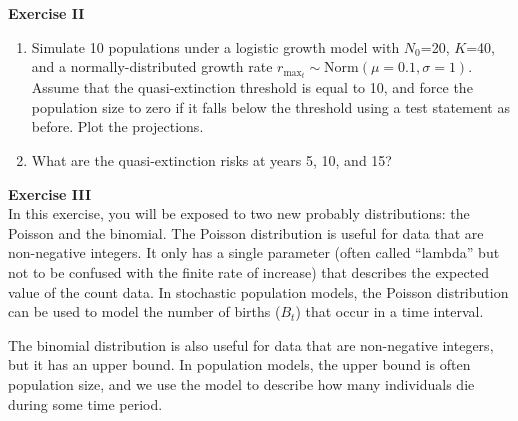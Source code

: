 \documentclass[12pt]{article}\usepackage[]{graphicx}\usepackage[]{color}
\begin{document}
\vspace{12pt}


{\bf Exercise II \\}
\begin{enumerate}
  \item Simulate 10 populations under a logistic growth model with
    $N_0$=20, $K$=40, and a normally-distributed growth rate $r_{\mathrm{max}_t}
    \sim \mathrm{Norm}(\mu=0.1, \sigma=1)$. Assume that the
    quasi-extinction threshold is
    equal to 10, and force the population size to zero if it falls
    below the threshold using a test statement as before. Plot the
    projections.
  \item What are the quasi-extinction risks at years 5, 10, and 15?
\end{enumerate}


\newpage


{\bf Exercise III \\}
In this exercise, you will be exposed to two new probably
distributions: the Poisson and the binomial. The Poisson distribution
is useful for data that are non-negative integers. It only has
a single parameter (often called ``lambda'' but not to be confused with the
finite rate of increase) that describes the expected value of the
count data. In stochastic population models, the Poisson distribution
can be used to model the number of births ($B_t$) that occur in a time
interval. 

The binomial distribution is also useful for data that are
non-negative integers, but it has an upper bound. In population
models, the upper bound is often population size, and we use the model
to describe how many individuals die during some time period.
\end{document}
